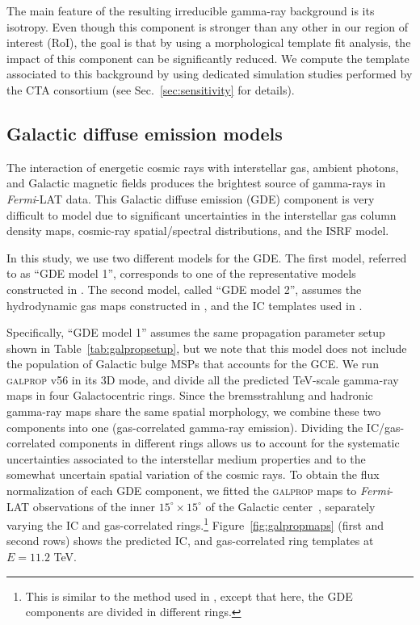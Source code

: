 \documentclass[doublespace,nopageskip]{VTthesis}
\begin{document}
The main feature of the resulting irreducible gamma-ray background is its isotropy. Even though this component is stronger than any other in our region of interest (RoI), the goal is that by using a morphological template fit analysis, the impact of this component can be significantly reduced. We compute the template associated to this background by using dedicated simulation studies performed by the CTA consortium (see Sec.~\ref{sec:sensitivity} for details). 


\subsection{Galactic diffuse emission models}
\label{subsec:GDEmodels}

The interaction of energetic cosmic rays with interstellar gas, ambient photons, and Galactic magnetic fields produces the brightest source of gamma-rays in \textit{Fermi}-LAT data. This Galactic diffuse emission (GDE) component is very difficult to model due to significant uncertainties in the interstellar gas column density maps, cosmic-ray spatial/spectral distributions, and the ISRF model.   

In this study, we use two different models for the GDE. The first model, referred to as ``GDE model 1'', corresponds to one of the representative models constructed in \cite{2018ApJ...856...45J}. The second model, called ``GDE model 2'', assumes the hydrodynamic gas maps constructed in \cite{2018NatAs...2..387M}, and the IC templates used in \cite{2020PhRvD.102d3012A}.     

Specifically, ``GDE model 1'' assumes the same propagation parameter setup shown in Table~\ref{tab:galpropsetup}, but we note that this model does not include the population of Galactic bulge MSPs that accounts for the GCE. We run \textsc{galprop } v56 in its 3D mode, and divide all the predicted TeV-scale gamma-ray maps in four Galactocentric rings. Since the bremsstrahlung and hadronic gamma-ray maps share the same spatial morphology, we combine these two components into one (gas-correlated gamma-ray emission). Dividing the IC/gas-correlated components in different rings allows us to account for the systematic uncertainties associated to the interstellar medium properties and to the somewhat uncertain spatial variation of the cosmic rays. 
To obtain the flux normalization of each GDE component, we fitted the \textsc{galprop} maps to \textit{Fermi}-LAT observations of the inner $15^\circ \times 15^\circ$ of the Galactic center~\citep{2018NatAs...2..387M}, separately varying the IC and gas-correlated rings.\footnote{This is similar to the method used in \cite{2021PhRvD.103b3011R}, except that here, the GDE components are divided in different rings.} Figure~\ref{fig:galpropmaps} (first and second rows) shows the predicted IC, and gas-correlated ring templates at $E=11.2$ TeV. 
\end{document}
